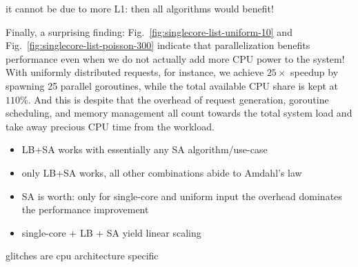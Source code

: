 it cannot be due to more L1: then all algorithms would benefit!

Finally, a surprising finding: Fig.~\ref{fig:singlecore-list-uniform-10} and Fig.~\ref{fig:singlecore-list-poisson-300} indicate that parallelization benefits performance even when we do not actually add more CPU power to the system! With uniformly distributed requests, for instance, we achieve $25\times$ speedup by spawning 25 parallel goroutines, while the total available CPU share is kept at $110$\%. %
And this is despite that the overhead of request generation, goroutine scheduling, and memory management all count towards the total system load and take away precious CPU time from the workload.

\begin{itemize}
\item LB+SA works with essentially any SA algorithm/use-case
\item only LB+SA works, all other combinations abide to Amdahl's law
\item SA is worth: only for single-core and uniform input the overhead dominates the performance improvement
\item single-core + LB + SA yield linear scaling
\end{itemize}


glitches are cpu architecture specific

%








